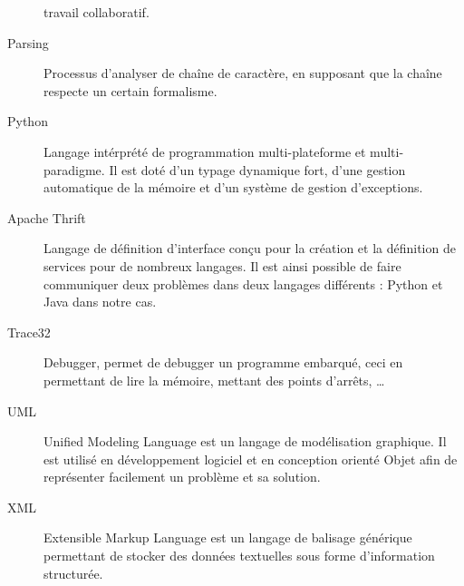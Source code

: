 \begin{description}
	travail collaboratif.
\item[Parsing] Processus d'analyser de chaîne de caractère, en supposant que la chaîne respecte un certain formalisme. 
\item[Python] Langage intérprété de programmation multi-plateforme et multi-paradigme. Il est doté d'un typage dynamique fort, d'une gestion automatique de la mémoire et d'un système de gestion d'exceptions. 
\item[Apache Thrift] Langage de définition d'interface conçu pour la création et la définition de services pour de nombreux langages. Il est ainsi possible de
	faire communiquer deux problèmes dans deux langages différents : Python et Java dans notre cas.
\item[Trace32] Debugger, permet de debugger un programme embarqué, ceci en permettant de lire la mémoire, mettant des points d'arrêts, \ldots
\item[UML] Unified Modeling Language est un langage de modélisation graphique. Il est utilisé en développement logiciel et en conception orienté Objet afin de
	représenter facilement un problème et sa solution.
\item[XML] Extensible Markup Language est un langage de balisage générique permettant de stocker des données textuelles sous forme d'information structurée.
\end{description}

